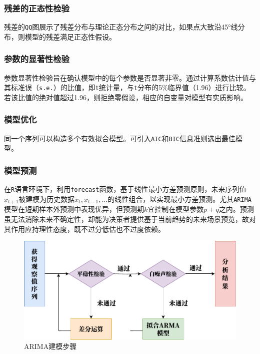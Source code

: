 \documentclass{article} %
\begin{document}
\subsubsection{残差的正态性检验}
残差的\texttt{QQ}图展示了残差分布与理论正态分布之间的对比，如果点大致沿45°线分布，则模型的残差满足正态性假设。

\subsubsection{参数的显著性检验}
参数显著性检验旨在确认模型中的每个参数是否显著非零。通过计算系数估计值与其标准误（\texttt{s.e.}）的比值，即\texttt{t}统计量，与\texttt{t}分布的5\%临界值（1.96）进行比较。若该比值的绝对值超过1.96，则拒绝零假设，相应的自变量对模型有实质影响。

\subsubsection{模型优化}
同一个序列可以构造多个有效拟合模型。可引入\texttt{AIC}和\texttt{BIC}信息准则选出最佳模型。

\subsubsection{模型预测}
在\texttt{R}语言环境下，利用\texttt{forecast}函数，基于线性最小方差预测原则，未来序列值\(x_{t+1}\)被建模为历史数据\(x_t, x_{t-1}, \ldots\)的线性组合，以实现最小方差预测。尤其\texttt{ARIMA}模型在短期样本外预测中表现优异，但预测期\(k\)宜控制在模型参数\(p+q\)之内。预测虽无法消除未来不确定性，却能为决策者提供基于当前趋势的未来场景预览，故对其作用应持理性态度，既不过分低估也不过度依赖。
\begin{figure}[H] %
	\centering %
	\includegraphics[width=\textwidth]{pic/ARIMA_new.pdf} %
	\caption{ARIMA建模步骤} %
	\label{} %
\end{figure}
\end{document}
